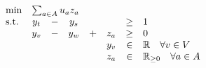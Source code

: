 \documentclass[12pt, a4]{article}
\begin{document}
\begin{equation}
	\begin{array}{lccccccl}
		\min & \multicolumn{6}{l}{\sum_{a\in A} u_a z_a}  \\
		\text{s.t.} & y_t & - & y_s &   &     & \geq & 1 \\
					& y_v & - & y_w & + & z_a & \geq & 0 \\
					&     &   &     &   & y_v & \in  & \mathbb{R} \quad \forall v \in V \\
					&     &   &     &   & z_a & \in  & \mathbb{R}_{\geq0} \quad \forall a \in A \\
	\end{array}
	\label{eq:prob3_lp}
\end{equation}
\end{document}
